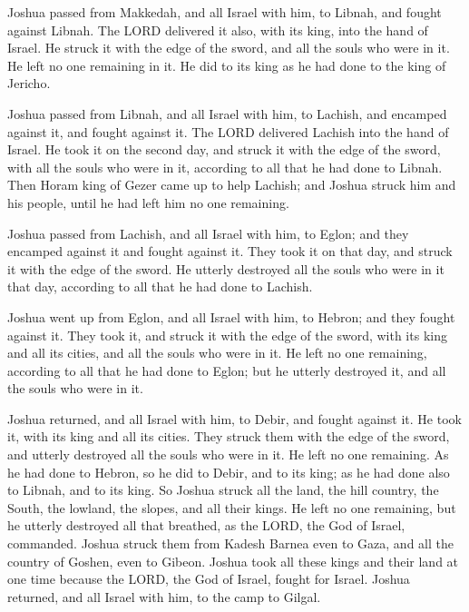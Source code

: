  Joshua passed from Makkedah, and all Israel with him, to
Libnah, and fought against Libnah.  The LORD delivered it
also, with its king, into the hand of Israel. He struck it with the edge
of the sword, and all the souls who were in it. He left no one remaining
in it. He did to its king as he had done to the king of Jericho.

 Joshua passed from Libnah, and all Israel with him, to
Lachish, and encamped against it, and fought against it. 
The LORD delivered Lachish into the hand of Israel. He took it on the
second day, and struck it with the edge of the sword, with all the souls
who were in it, according to all that he had done to Libnah.
 Then Horam king of Gezer came up to help Lachish; and
Joshua struck him and his people, until he had left him no one
remaining.

 Joshua passed from Lachish, and all Israel with him, to
Eglon; and they encamped against it and fought against it. 
They took it on that day, and struck it with the edge of the sword. He
utterly destroyed all the souls who were in it that day, according to
all that he had done to Lachish.

 Joshua went up from Eglon, and all Israel with him, to
Hebron; and they fought against it.  They took it, and
struck it with the edge of the sword, with its king and all its cities,
and all the souls who were in it. He left no one remaining, according to
all that he had done to Eglon; but he utterly destroyed it, and all the
souls who were in it.

 Joshua returned, and all Israel with him, to Debir, and
fought against it.  He took it, with its king and all its
cities. They struck them with the edge of the sword, and utterly
destroyed all the souls who were in it. He left no one remaining. As he
had done to Hebron, so he did to Debir, and to its king; as he had done
also to Libnah, and to its king.  So Joshua struck all the
land, the hill country, the South, the lowland, the slopes, and all
their kings. He left no one remaining, but he utterly destroyed all that
breathed, as the LORD, the God of Israel, commanded. 
Joshua struck them from Kadesh Barnea even to Gaza, and all the country
of Goshen, even to Gibeon.  Joshua took all these kings and
their land at one time because the LORD, the God of Israel, fought for
Israel.  Joshua returned, and all Israel with him, to the
camp to Gilgal.


